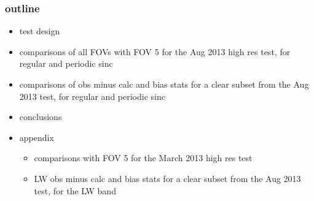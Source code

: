 \begin{frame}
\frametitle{outline}

\begin{itemize}
  \item test design

  \item comparisons of all FOVs with FOV 5 for the Aug 2013 high
    res test, for regular and periodic sinc

  \item comparisons of obs minus calc and bias stats for a clear
    subset from the Aug 2013 test, for regular and periodic sinc
  
  \item conclusions

  \item appendix

  \begin{itemize}
    \item comparisons with FOV 5 for the March 2013 high res test

    \item LW obs minus calc and bias stats for a clear subset from
      the Aug 2013 test, for the LW band

  \end{itemize}

\end{itemize}

\end{frame}
